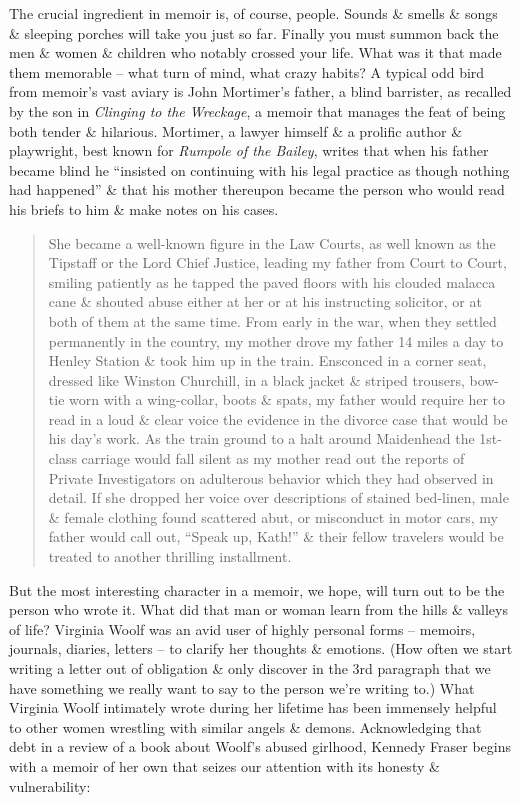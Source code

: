 \documentclass{article}
\begin{document}
The crucial ingredient in memoir is, of course, people. Sounds \& smells \& songs \& sleeping porches will take you just so far. Finally you must summon back the men \& women \& children who notably crossed your life. What was it that made them memorable -- what turn of mind, what crazy habits? A typical odd bird from memoir's vast aviary is John Mortimer's father, a blind barrister, as recalled by the son in \textit{Clinging to the Wreckage}, a memoir that manages the feat of being both tender \& hilarious. Mortimer, a lawyer himself \& a prolific author \& playwright, best known for \textit{Rumpole of the Bailey}, writes that when his father became blind he ``insisted on continuing with his legal practice as though nothing had happened'' \& that his mother thereupon became the person who would read his briefs to him \& make notes on his cases.
\begin{quotation}
	She became a well-known figure in the Law Courts, as well known as the Tipstaff or the Lord Chief Justice, leading my father from Court to Court, smiling patiently as he tapped the paved floors with his clouded malacca cane \& shouted abuse either at her or at his instructing solicitor, or at both of them at the same time. From early in the war, when they settled permanently in the country, my mother drove my father 14 miles a day to Henley Station \& took him up in the train. Ensconced in a corner seat, dressed like Winston Churchill, in a black jacket \& striped trousers, bow-tie worn with a wing-collar, boots \& spats, my father would require her to read in a loud \& clear voice the evidence in the divorce case that would be his day's work. As the train ground to a halt around Maidenhead the 1st-class carriage would fall silent as my mother read out the reports of Private Investigators on adulterous behavior which they had observed in detail. If she dropped her voice over descriptions of stained bed-linen, male \& female clothing found scattered abut, or misconduct in motor cars, my father would call out, ``Speak up, Kath!'' \& their fellow travelers would be treated to another thrilling installment.
\end{quotation}
But the most interesting character in a memoir, we hope, will turn out to be the person who wrote it. What did that man or woman learn from the hills \& valleys of life? Virginia Woolf was an avid user of highly personal forms -- memoirs, journals, diaries, letters -- to clarify her thoughts \& emotions. (How often we start writing a letter out of obligation \& only discover in the 3rd paragraph that we have something we really want to say to the person we're writing to.) What Virginia Woolf intimately wrote during her lifetime has been immensely helpful to other women wrestling with similar angels \& demons. Acknowledging that debt in a review of a book about Woolf's abused girlhood, Kennedy Fraser begins with a memoir of her own that seizes our attention with its honesty \& vulnerability:
\end{document}
